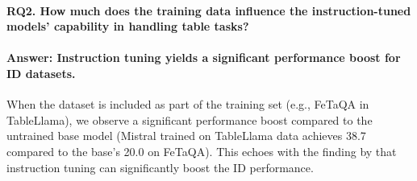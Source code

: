 \documentclass[11pt]{article}
\begin{document}

\paragraph{RQ2. How much does the training data influence the instruction-tuned models' capability in handling table tasks?}

\paragraph{Answer: Instruction tuning yields a significant performance boost for ID datasets.} 
When the dataset is included as part of the training set (e.g., FeTaQA in TableLlama), we observe a significant performance boost compared to the untrained base model (Mistral trained on TableLlama data achieves 38.7 compared to the base's 20.0 on FeTaQA).
This echoes with the finding by \citet{zhang-etal-2024-tablellama, deng2025rethinking} that instruction tuning can significantly boost the ID performance.
\end{document}
